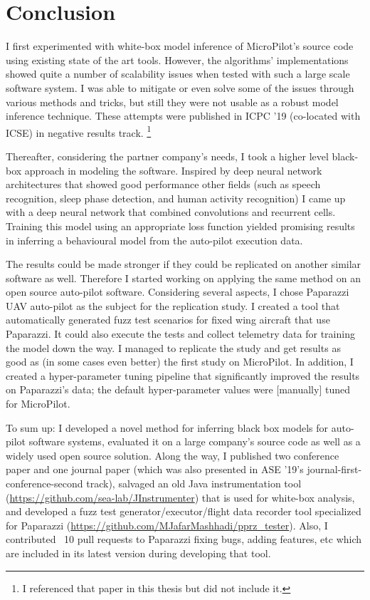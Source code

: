 \chapter{Conclusion} %
I first experimented with white-box model inference of MicroPilot's source code using existing state of the art tools. 
However, the algorithms' implementations showed quite a number of scalability issues when tested with such a large scale software system. I was able to mitigate or even solve some of the issues through various methods and tricks, but still they were not usable as a robust model inference technique. These attempts were published in ICPC '19 (co-located with ICSE) in negative results track. \footnote{I referenced that paper \cite{mashhadi2019empirical} in this thesis but did not include it.}

Thereafter, considering the partner company's needs, I took a higher level black-box approach in modeling the software. Inspired by deep neural network architectures that showed good performance other fields (such as speech recognition, sleep phase detection, and human activity recognition) I came up with a deep neural network that combined convolutions and recurrent cells. Training this model using an appropriate loss function yielded promising results in inferring a behavioural model from the auto-pilot execution data.

The results could be made stronger if they could be replicated on another similar software as well. Therefore I started working on applying the same method on an open source auto-pilot software. Considering several aspects, I chose Paparazzi UAV auto-pilot as the subject for the replication study. I created a tool that automatically generated fuzz test scenarios for fixed wing aircraft that use Paparazzi. It could also execute the tests and collect telemetry data for training the model down the way. 
I managed to replicate the study and get results as good as (in some cases even better) the first study on MicroPilot. In addition, I created a hyper-parameter tuning pipeline that significantly improved the results on Paparazzi's data; the default hyper-parameter values were [manually] tuned for MicroPilot.

To sum up: I developed a novel method for inferring black box models for auto-pilot software systems, evaluated it on a large company's source code as well as a widely used open source solution. Along the way, I published two conference paper and one journal paper (which was also presented in ASE '19's journal-first-conference-second track), salvaged an old Java instrumentation tool (\url{https://github.com/sea-lab/JInstrumenter}) that is used for white-box analysis, and developed a fuzz test generator/executor/flight data recorder tool specialized for Paparazzi (\url{https://github.com/MJafarMashhadi/pprz_tester}). Also, I contributed ~10 pull requests to Paparazzi fixing bugs, adding features, etc which are included in its latest version during developing that tool.


